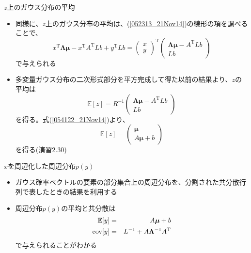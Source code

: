\begin{frame}{$z$上のガウス分布の平均}
 \begin{itemize}
  \item 同様に、$z$上のガウス分布の平均は、(\ref{052313_21Nov14})の線形の項を調べることで、
        \begin{equation}
         x^{\mathrm{T}}\bm{\Lambda}\bm{\mu}-x^{\mathrm{T}}A^{\mathrm{T}}Lb+y^{\mathrm{T}}Lb =
          \begin{pmatrix}
           x \\
           y
          \end{pmatrix}^{\mathrm{T}}
          \begin{pmatrix}
           \bm{\Lambda}\bm{\mu}-A^{\mathrm{T}}Lb \\
           Lb
          \end{pmatrix}
        \end{equation}
        で与えられる
  \item 多変量ガウス分布の二次形式部分を平方完成して得た以前の結果より、$z$の平均は
        \begin{equation}
         \mathbb{E}[z]=R^{-1}
          \begin{pmatrix}
           \bm{\Lambda}\bm{\mu}-A^{\mathrm{T}}Lb \\
           Lb
          \end{pmatrix}
        \end{equation}
        を得る。式(\ref{054122_21Nov14})より、
        \begin{equation}
         \mathbb{E}[z]=
          \begin{pmatrix}
           \bm{\mu} \\
           A\bm{\mu} + b
          \end{pmatrix}
        \end{equation}
        を得る(演習2.30)
 \end{itemize}
\end{frame}

\begin{frame}{$x$を周辺化した周辺分布$p(y)$}
 \begin{itemize}
  \item ガウス確率ベクトルの要素の部分集合上の周辺分布を、分割された共分散行列で表したときの結果を利用する
  \item 周辺分布$p(y)$の平均と共分散は
        \begin{eqnarray}
         \mathbb{E}[y] &= &A\bm{\mu} +b\\
         {\rm cov}[y] &=& L^{-1} + A\bm{\Lambda}^{-1}A^{\mathrm{T}}
        \end{eqnarray}
        で与えられることがわかる
 \end{itemize}
\end{frame}


